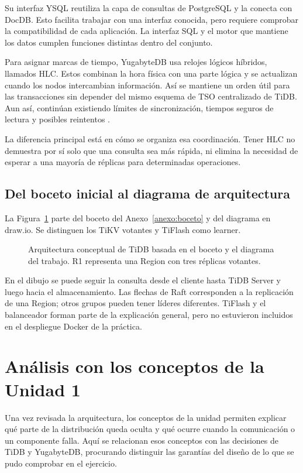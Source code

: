 \documentclass[11pt,a4paper]{article}
\begin{document}
Su interfaz YSQL reutiliza la capa de consultas de PostgreSQL y la conecta con DocDB. Esto facilita trabajar con una interfaz conocida, pero requiere comprobar la compatibilidad de cada aplicación. La interfaz SQL y el motor que mantiene los datos cumplen funciones distintas dentro del conjunto.

Para asignar marcas de tiempo, YugabyteDB usa relojes lógicos híbridos, llamados HLC. Estos combinan la hora física con una parte lógica y se actualizan cuando los nodos intercambian información. Así se mantiene un orden útil para las transacciones sin depender del mismo esquema de TSO centralizado de TiDB. Aun así, continúan existiendo límites de sincronización, tiempos seguros de lectura y posibles reintentos \cite{yb_tx}.

La diferencia principal está en cómo se organiza esa coordinación. Tener HLC no demuestra por sí solo que una consulta sea más rápida, ni elimina la necesidad de esperar a una mayoría de réplicas para determinadas operaciones.

\subsection{Del boceto inicial al diagrama de arquitectura}
La Figura~\ref{fig:arquitectura} parte del boceto del Anexo~\ref{anexo:boceto} y del diagrama en draw.io. Se distinguen los TiKV votantes y TiFlash como learner.

\begin{figure}[H]
\centering
\resizebox{\linewidth}{!}{}
\caption{Arquitectura conceptual de TiDB basada en el boceto y el diagrama del trabajo. R1 representa una Region con tres réplicas votantes.}
\label{fig:arquitectura}
\end{figure}

En el dibujo se puede seguir la consulta desde el cliente hasta TiDB Server y luego hacia el almacenamiento. Las flechas de Raft corresponden a la replicación de una Region; otros grupos pueden tener líderes diferentes. TiFlash y el balanceador forman parte de la explicación general, pero no estuvieron incluidos en el despliegue Docker de la práctica.

\section{Análisis con los conceptos de la Unidad 1}
Una vez revisada la arquitectura, los conceptos de la unidad permiten explicar qué parte de la distribución queda oculta y qué ocurre cuando la comunicación o un componente falla. Aquí se relacionan esos conceptos con las decisiones de TiDB y YugabyteDB, procurando distinguir las garantías del diseño de lo que se pudo comprobar en el ejercicio.
\end{document}
